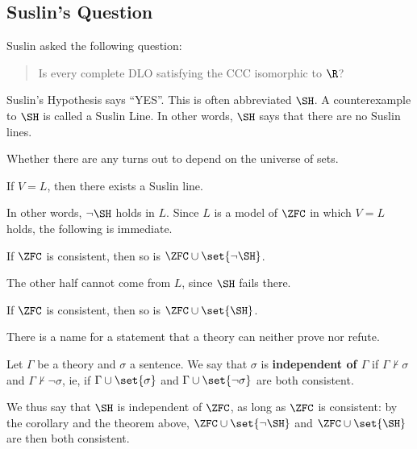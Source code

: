 \subsection{Suslin's Question}

Suslin asked the following question:
\begin{quote}
    Is every complete DLO satisfying the CCC isomorphic to $\R$?
\end{quote}
Suslin's Hypothesis says ``YES''. This is often abbreviated $\SH$. A counterexample to $\SH$ is called a Suslin Line. In other words, $\SH$ says that there are no Suslin lines.

Whether there are any turns out to depend on the universe of sets.

\begin{boxtheorem}[Jensen, 1960s]
    If $V = L$, then there exists a Suslin line.
\end{boxtheorem}

In other words, $\neg\SH$ holds in $L$. Since $L$ is a model of $\ZFC$ in which $V = L$ holds, the following is immediate.

\begin{boxcorollary}
    If $\ZFC$ is consistent, then so is $\ZFC \cup \set{\neg\SH}$.
\end{boxcorollary}

The other half cannot come from $L$, since $\SH$ fails there.

\begin{boxtheorem}
    If $\ZFC$ is consistent, then so is $\ZFC \cup \set{\SH}$.
\end{boxtheorem}

There is a name for a statement that a theory can neither prove nor refute.

\begin{boxdefinition}[Independence]
    Let $\Gamma$ be a theory and $\sigma$ a sentence. We say that $\sigma$ is \textbf{independent of $\Gamma$} if $\Gamma \nvdash \sigma$ and $\Gamma \nvdash \neg\sigma$, ie, if $\Gamma \cup \set{\sigma}$ and $\Gamma \cup \set{\neg\sigma}$ are both consistent.
\end{boxdefinition}

We thus say that $\SH$ is independent of $\ZFC$, as long as $\ZFC$ is consistent: by the corollary and the theorem above, $\ZFC \cup \set{\neg\SH}$ and $\ZFC \cup \set{\SH}$ are then both consistent.
